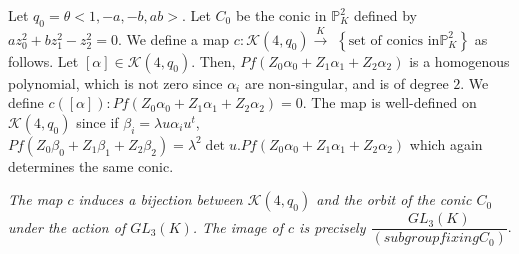 Let $q_0=\theta <1,-a, -b, ab>$. Let $C_0$ be the conic in $\mathbb{P}^{2}_K$ defined by $a z^{2}_0+b z^{2}_1-z^{2}_2=0$. We define a map $c:\mathscr{K}(4, q_0)\xrightarrow{K}$ $\left\{ \text{set of conics in} \mathbb{P}^{2}_K\right\}$ as follows. Let $[\alpha]\in \mathscr{K}(4,q_0)$. Then, $Pf(Z_0\alpha_0+Z_1\alpha_1+Z_2\alpha_2)$ is a homogenous polynomial, which is not zero since $\alpha_i$ are non-singular, and is of degree $2$. We define $c([\alpha]):Pf(Z_0\alpha_0+Z_1 \alpha_1+Z_2 \alpha_2)=0$. The map is well-defined on $\mathscr{K}(4,q_0)$ since if $\beta_i=\lambda u\alpha_i u^{t}$, $Pf(Z_0 \beta_0+Z_1\beta_1+Z_2\beta_2)=\lambda^{2}\det u. Pf(Z_0\alpha_0+Z_1\alpha_1+Z_2\alpha_2)$ which again determines the same conic. 

\begin{THM}\pageoriginale
\textit{The map $c$ induces a bijection between $\mathscr{K}(4,q_0)$ and the orbit of the conic $C_0$ under the action of $GL_3(K)$. The image of $c$ is precisely $\dfrac{GL_3(K)}{(subgroup fixing C_0)}$}.
\end{THM}

